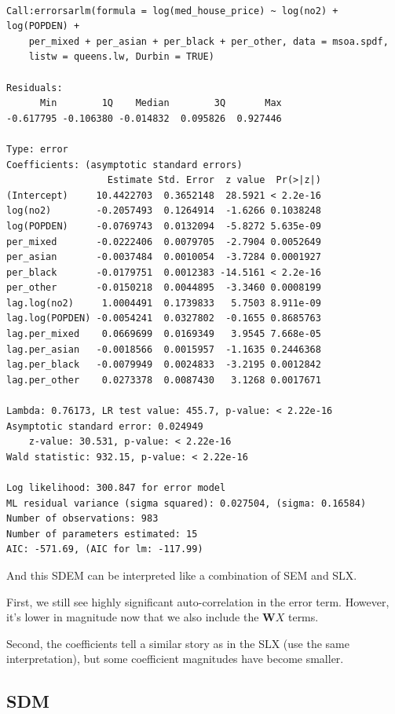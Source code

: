 \documentclass[
  letterpaper,
]{scrbook}
\begin{document}
\begin{verbatim}

Call:errorsarlm(formula = log(med_house_price) ~ log(no2) + log(POPDEN) + 
    per_mixed + per_asian + per_black + per_other, data = msoa.spdf, 
    listw = queens.lw, Durbin = TRUE)

Residuals:
      Min        1Q    Median        3Q       Max 
-0.617795 -0.106380 -0.014832  0.095826  0.927446 

Type: error 
Coefficients: (asymptotic standard errors) 
                  Estimate Std. Error  z value  Pr(>|z|)
(Intercept)     10.4422703  0.3652148  28.5921 < 2.2e-16
log(no2)        -0.2057493  0.1264914  -1.6266 0.1038248
log(POPDEN)     -0.0769743  0.0132094  -5.8272 5.635e-09
per_mixed       -0.0222406  0.0079705  -2.7904 0.0052649
per_asian       -0.0037484  0.0010054  -3.7284 0.0001927
per_black       -0.0179751  0.0012383 -14.5161 < 2.2e-16
per_other       -0.0150218  0.0044895  -3.3460 0.0008199
lag.log(no2)     1.0004491  0.1739833   5.7503 8.911e-09
lag.log(POPDEN) -0.0054241  0.0327802  -0.1655 0.8685763
lag.per_mixed    0.0669699  0.0169349   3.9545 7.668e-05
lag.per_asian   -0.0018566  0.0015957  -1.1635 0.2446368
lag.per_black   -0.0079949  0.0024833  -3.2195 0.0012842
lag.per_other    0.0273378  0.0087430   3.1268 0.0017671

Lambda: 0.76173, LR test value: 455.7, p-value: < 2.22e-16
Asymptotic standard error: 0.024949
    z-value: 30.531, p-value: < 2.22e-16
Wald statistic: 932.15, p-value: < 2.22e-16

Log likelihood: 300.847 for error model
ML residual variance (sigma squared): 0.027504, (sigma: 0.16584)
Number of observations: 983 
Number of parameters estimated: 15 
AIC: -571.69, (AIC for lm: -117.99)
\end{verbatim}

And this SDEM can be interpreted like a combination of SEM and SLX.

First, we still see highly significant auto-correlation in the error
term. However, it's lower in magnitude now that we also include the
\(\boldsymbol{\mathbf{W}} X\) terms.

Second, the coefficients tell a similar story as in the SLX (use the
same interpretation), but some coefficient magnitudes have become
smaller.

\hypertarget{sdm}{%
\subsection{SDM}\label{sdm}}
\end{document}
